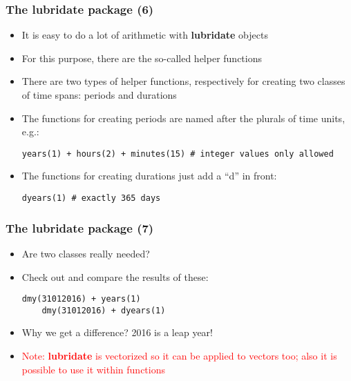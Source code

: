 \documentclass[10pt]{beamer}
\theoremstyle{definition}
\begin{document}
\begin{frame}[fragile]
\frametitle{The \textbf{lubridate} package (6)}
\begin{itemize}
	\item It is easy to do a lot of arithmetic with \textbf{lubridate} objects
	\item For this purpose, there are the so-called helper functions
	\item There are two types of helper functions, respectively for creating two classes of time spans: periods and durations
	\item The functions for creating periods are named after the plurals of time units, e.g.:
	\begin{lstlisting}[style = rstyle, breaklines]
	years(1) + hours(2) + minutes(15) # integer values only allowed
	\end{lstlisting}
	\item The functions for creating durations just add a ``d'' in front:
	\begin{lstlisting}[style = rstyle, breaklines]
	dyears(1) # exactly 365 days
	\end{lstlisting}
\end{itemize}
\end{frame}

\begin{frame}[fragile]
\frametitle{The \textbf{lubridate} package (7)}
\begin{itemize}
	\item Are two classes really needed?
	\item Check out and compare the results of these:
	\begin{lstlisting}[style = rstyle, breaklines]
	dmy(31012016) + years(1)
	dmy(31012016) + dyears(1)
	\end{lstlisting}
	\item Why we get a difference? 2016 is a leap year!
	\item \textcolor{red}{Note: \textbf{lubridate} is vectorized so it can be applied to vectors too; also it is possible to use it within functions}
\end{itemize}
\end{frame}
\end{document}
